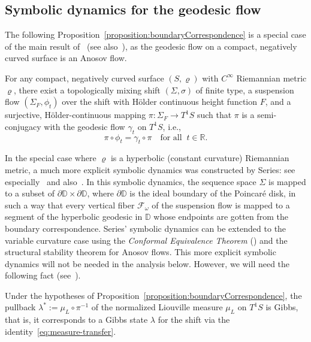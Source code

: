 \documentclass[AHL, Unicode, longabstracts, published]{cedram}
\newcommand{\zz}[1]{\mathbb #1}
\begin{document}
\subsection{Symbolic dynamics for the geodesic flow}\label{ssec:symbDynGF}

The following Proposition~\ref{proposition:boundaryCorrespondence} is a special case of the main result of~\cite{ratner:markov} (see also~\cite{bowen:symbDyn}), as the geodesic flow on a compact, negatively curved surface is an Anosov flow.

\begin{prop}\label{proposition:boundaryCorrespondence}
For any compact, negatively curved surface $(S, \varrho)$ with $C^{\infty}$ Riemannian metric $\varrho$, there exist a topologically mixing shift $(\Sigma,\sigma)$ of finite type, a suspension flow $(\Sigma_{F},\phi_{t})$ over the shift with H\"older continuous height function $F$, and a surjective, H\"older-continuous mapping $\pi:\Sigma_{F} \rightarrow T^1S$ such that $\pi$ is a semi-conjugacy with the geodesic flow $\gamma_{t}$ on $T^1S$, i.e.,
\begin{equation}\label{eq:semi-conjugacy}
\pi \circ \phi_{t}=\gamma_{t} \circ \pi \quad \text{for all}\;\;t\in \zz{R}.
\end{equation}
\end{prop}


In the special case where $\varrho$ is a hyperbolic (constant curvature) Riemannian metric, a much more explicit symbolic dynamics was constructed by Series: see especially~\cite[Theorem~3.1]{series:symbDynFlows} and also~\cite{bowen-series}. In this symbolic dynamics, the sequence space $\Sigma$ is mapped to a subset of $\partial \mathbb{D}\times \partial \mathbb{D}$, where $\partial \mathbb{D}$ is the ideal boundary of the Poincaré disk, in such a way that every vertical fiber $\mathcal{F}_{\omega}$ of the suspension flow is mapped to a segment of the hyperbolic geodesic in $\mathbb{D}$ whose endpoints are gotten from the boundary correspondence. Series' symbolic dynamics can be extended to the variable curvature case using the \emph{Conformal Equivalence Theorem} (\cite[Theorem~V.1.3]{schoen-yau}) and the structural stability theorem for Anosov flows. This more explicit symbolic dynamics will not be needed in the analysis below. However, we will need the following fact (see~\cite[Chapter~7]{paulin-pollicott-schapira}).

\begin{prop}\label{proposition:LiouvilleGibbs}
Under the hypotheses of Proposition~\ref{proposition:boundaryCorrespondence}, the pullback $\lambda^{*}:=\mu_{L}\circ \pi^{-1}$ of the normalized Liouville measure $\mu_{L}$ on $T^{1}S$ is Gibbs, that is, it corresponds to a Gibbs state $\lambda$ for the shift via the identity~\eqref{eq:measure-transfer}.
\end{prop}
\end{document}

